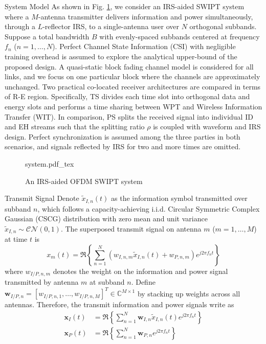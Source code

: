 \documentclass{IEEEtran}
\begin{document}
\begin{section}{System Model}
	As shown in Fig. \ref{fi:system}, we consider an IRS-aided SWIPT system where a $M$-antenna transmitter delivers information and power simultaneously, through a $L$-reflector IRS, to a single-antenna user over $N$ orthogonal subbands. Suppose a total bandwidth $B$ with evenly-spaced subbands centered at frequency $f_n$ ($n=1,\dots,N$). Perfect Channel State Information (CSI) with negligible training overhead is assumed to explore the analytical upper-bound of the proposed design. A quasi-static block fading channel model is considered for all links, and we focus on one particular block where the channels are approximately unchanged. Two practical co-located receiver architectures are compared in terms of R-E region. Specifically, TS divides each time slot into orthogonal data and energy slots and performs a time sharing between WPT and Wireless Information Transfer (WIT). In comparison, PS splits the received signal into individual ID and EH streams such that the splitting ratio $\rho$ is coupled with waveform and IRS design. Perfect synchronization is assumed among the three parties in both scenarios, and signals reflected by IRS for two and more times are omitted.

	\begin{figure}
		\centering
		\def\svgwidth{\columnwidth}
		{system.pdf_tex}
		\caption{An IRS-aided OFDM SWIPT system}
		\label{fi:system}
	\end{figure}

	\begin{subsection}{Transmit Signal}
		Denote $\tilde{x}_{I,n}(t)$ as the information symbol transmitted over subband $n$, which follows a capacity-achieving i.i.d. Circular Symmetric Complex Gaussian (CSCG) distribution with zero mean and unit variance $\tilde{x}_{I,n}\sim\mathcal{CN}(0,1)$. The superposed transmit signal on antenna $m$ ($m=1,\dots,M$) at time $t$ is
		\begin{equation}\label{eq:x_m}
			x_m(t)=\Re\left\{\sum_{n=1}^N\left({w_{I,n,m}\tilde{x}_{I,n}(t)}+w_{P,n,m}\right){e^{j2{\pi}{f_n}{t}}}\right\}
		\end{equation}
		where $w_{I/P,n,m}$ denotes the weight on the information and power signal transmitted by antenna $m$ at subband $n$. Define $\boldsymbol{w}_{I/P,n}=[w_{I/P,n,1},\dots,w_{I/P,n,M}]^T \in \mathbb{C}^{M \times 1}$ by stacking up weights across all antennas. Therefore, the transmit information and power signals write as
		\begin{align}
			\boldsymbol{x}_{I}(t) &= \Re{\left\{\sum_{n=1}^N\boldsymbol{w}_{I,n}\tilde{x}_{I,n}(t){e^{j2{\pi}{f_n}{t}}}\right\}}\label{eq:x_I}\\
			\boldsymbol{x}_{P}(t) &= \Re{\left\{\sum_{n=1}^N\boldsymbol{w}_{P,n}{e^{j2{\pi}{f_n}{t}}}\right\}}\label{eq:x_P}
		\end{align}
	\end{subsection}


\end{section}
\end{document}
